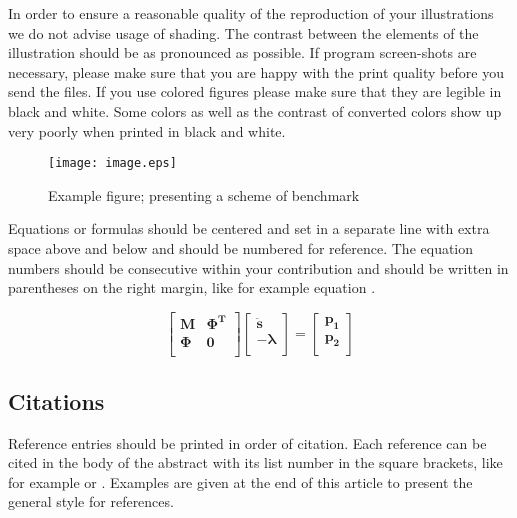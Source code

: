 \documentclass{mbd_fullpaper}
\begin{document}
In order to ensure a reasonable quality of the reproduction of your illustrations we do not advise usage of shading. The contrast between the elements of the illustration should be as pronounced as possible. If program screen-shots are necessary, please make sure that you are happy with the print quality before you send the files. If you use colored figures please make sure that they are legible in black and white. Some colors as well as the contrast of converted colors show up very poorly when printed in black and white.


\begin{figure}[ht]
  \begin{center}
    \texttt{[image: image.eps]}
    \caption{Example figure; presenting a scheme of benchmark \cite{Author2016}}
    \label{fig:fig1}
  \end{center}
\end{figure}


Equations or formulas should be centered and set in a separate line with extra space above and below and should be numbered for reference. The equation numbers should be consecutive within your contribution and should be written in parentheses on the right margin, like for example equation .

\begin{equation}
  \left [
  \begin{array}{cc}
    \boldsymbol{M}& \boldsymbol{\Phi^T}\\
    \boldsymbol{\Phi}& \boldsymbol{0}\\
  \end{array}
  \right ]
  \left [
  \begin{array}{c}
    \bm{\ddot s}\\
    -\boldsymbol{\lambda}\\
  \end{array}
  \right ]
  =
  \left [
  \begin{array}{c}
    \boldsymbol{p_1}\\
    \boldsymbol{p_2}\\
  \end{array}
  \right ]
  \label{eqn1}
\end{equation}


\subsection{Citations}

Reference entries should be printed in order of citation. Each reference can be cited in the body of the abstract with its list number in the square brackets, like for example \cite{Schiehlen1997} or \cite{Author2016}. Examples are given at the end of this article to present the general style for references.
\end{document}
